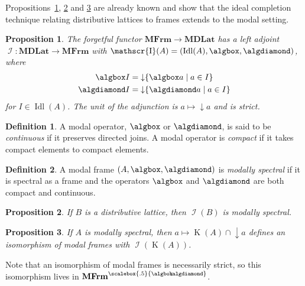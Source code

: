 \documentclass{article}[a4paper]
\newtheorem{proposition}{Proposition}%
\theoremstyle{definition}
\newtheorem{definition}{Definition}%
\newcommand{\mfrm}{\mathbf{MFrm}}
\newcommand{\mfrms}{\mathbf{MFrm}^{\scalebox{.5}{\algbox\!\!\!\algdiamond}}}
\newcommand{\mdlat}{\mathbf{MDLat}}
\DeclareMathOperator{\downset}{\downarrow}
\DeclareMathOperator{\compacts}{K}
\DeclareMathOperator{\ideals}{Idl}
\DeclareMathOperator{\Irs}{\mathscr{I}}
\begin{document}
 Propositions~\ref{result:idealCompAdjunct}, \ref{result:distrib2spec} and \ref{result:spec2distrib} are already known \cite{hil00} and show that the ideal completion technique relating distributive lattices to frames extends to the modal setting.
\begin{proposition}
\label{result:idealCompAdjunct}
    The forgetful functor $\mfrm \longrightarrow \mdlat$ has a left adjoint
    $\Irs{}: \mdlat \longrightarrow \mfrm$ with 
    $\Irs(A) = (\ideals (A) , \algbox , \algdiamond)$, where
    \begin{align*}
        \algbox I &= \downset \{ \algbox a \mid a \in I \}\\
        \algdiamond I &= \downset \{ \algdiamond a \mid a \in I \}
    \end{align*}
    for $I \in \ideals (A)$. The unit of the adjunction is $a \mapsto \downset a$ and is strict.
\end{proposition}


\begin{definition}
A modal operator, $\algbox$ or $\algdiamond$, is said to be \emph{continuous} if it preserves directed joins. A modal operator is \emph{compact} if it takes compact elements to compact elements.
\end{definition}

\begin{definition}
A modal frame $(A, \algbox, \algdiamond)$ is \emph{modally  spectral} if it is spectral as a frame and the operators $\algbox$ and $\algdiamond$ are both compact and continuous.
\end{definition}

\begin{proposition}
\label{result:distrib2spec}
    If $B$ is a distributive lattice, then $\Irs(B)$ is modally spectral.
\end{proposition}

\begin{proposition}
\label{result:spec2distrib}
    If $A$ is modally spectral, then $a \mapsto  \compacts(A) \cap \downset a$  defines an isomorphism of modal frames with $\Irs(\compacts(A))$.
\end{proposition}
Note that an isomorphism of modal frames is necessarily strict, so this isomorphism lives in $\mfrms$.
\end{document}
